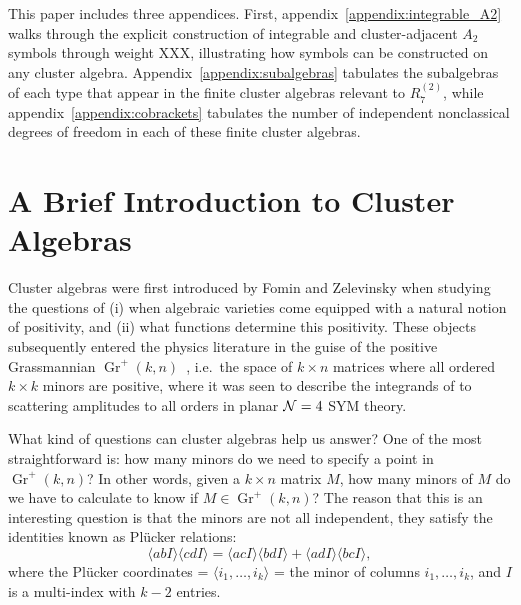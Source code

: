 \documentclass[11pt]{article}
\DeclareMathOperator{\Gr}{Gr}
\def\ket#1{\langle #1 \rangle}
\begin{document}
This paper includes three appendices. First, appendix~\ref{appendix:integrable_A2} walks through the explicit construction of integrable and cluster-adjacent $A_2$ symbols through weight XXX, illustrating how symbols can be constructed on any cluster algebra. Appendix~\ref{appendix:subalgebras} tabulates the subalgebras of each type that appear in the finite cluster algebras relevant to $R_7^{(2)}$, while appendix~\ref{appendix:cobrackets} tabulates the number of independent nonclassical degrees of freedom in each of these finite cluster algebras.


\section{A Brief Introduction to Cluster Algebras} \label{sec:brief_intro}

Cluster algebras were first introduced by Fomin and Zelevinsky \cite{1021.16017} when studying the questions of (i) when algebraic varieties come equipped with a natural notion of positivity, and (ii) what functions determine this positivity. These objects subsequently entered the physics literature in the guise of the positive Grassmannian $\Gr^+(k,n)$~\cite{}, i.e.~the space of $k\times n$ matrices where all ordered $k\times k$ minors are positive, where it was seen to describe the integrands of to scattering amplitudes to all orders in planar ${\cal N}=4$ SYM theory.

What kind of questions can cluster algebras help us answer? One of the most straightforward is: how many minors do we need to specify a point in $\Gr^+(k,n)$? In other words, given a $k \times n$ matrix $M$, how many minors of $M$ do we have to calculate to know if $M \in \Gr^+(k,n)$? The reason that this is an interesting question is that the minors are not all independent, they satisfy the identities known as Pl\"ucker relations:
\begin{equation}
  \label{eq:plucker-rel}
  \ket{abI} \ket{cdI} = \ket{acI} \ket{bdI} + \ket{adI}\ket{bcI},
\end{equation}
where the Pl\"ucker coordinates = $\ket{i_1,\ldots,i_k}$ = the minor of columns $i_1, \ldots,i_k$, and $I$ is a multi-index with $k-2$ entries.
\end{document}
